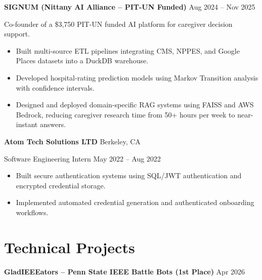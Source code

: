 \documentclass[11pt,a4paper]{article}
\begin{document}
\vspace{0.5em}

\textbf{SIGNUM (Nittany AI Alliance -- PIT-UN Funded)} \hfill Aug 2024 -- Nov 2025

Co-founder of a \$3,750 PIT-UN funded AI platform for caregiver decision support.

\begin{itemize}[leftmargin=1.5em]

\item Built multi-source ETL pipelines integrating CMS, NPPES, and Google Places datasets into a DuckDB warehouse.

\item Developed hospital-rating prediction models using Markov Transition analysis with confidence intervals.

\item Designed and deployed domain-specific RAG systems using FAISS and AWS Bedrock, reducing caregiver research time from 50+ hours per week to near-instant answers.

\end{itemize}

\vspace{0.5em}

\textbf{Atom Tech Solutions LTD} \hfill Berkeley, CA

Software Engineering Intern \hfill May 2022 -- Aug 2022

\begin{itemize}[leftmargin=1.5em]

\item Built secure authentication systems using SQL/JWT authentication and encrypted credential storage.

\item Implemented automated credential generation and authenticated onboarding workflows.

\end{itemize}

\section*{Technical Projects}

\textbf{GladIEEEators -- Penn State IEEE Battle Bots (1st Place)} \hfill Apr 2026
\end{document}
